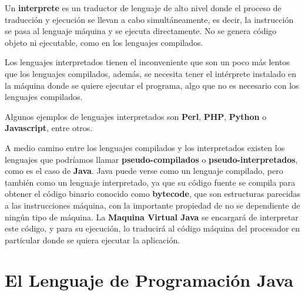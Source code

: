 Un \textbf{interprete} es un traductor de lenguaje de alto nivel donde el proceso de traducción y ejecución se llevan a cabo simultáneamente, es decir, la instrucción se pasa al lenguaje máquina y se ejecuta directamente. No se genera código objeto ni ejecutable, como en los lenguajes compilados.

Los lenguajes interpretados tienen el inconveniente que son un poco más lentos que los lenguajes compilados, además, se necesita tener el intérprete instalado en la máquina donde se quiere ejecutar el programa, algo que no es necesario con los lenguajes compilados.

Algunos ejemplos de lenguajes interpretados son \textbf{Perl}, \textbf{PHP}, \textbf{Python} o \textbf{Javascript}, entre otros.

A medio camino entre los lenguajes compilados y los interpretados existen los lenguajes que podríamos llamar \textbf{pseudo-compilados} o \textbf{pseudo-interpretados}, como es el caso de \textbf{Java}. Java puede verse como un lenguaje compilado, pero también como un lenguaje interpretado, ya que su código fuente se compila para obtener el código binario conocido como \textbf{bytecode}, que son estructuras parecidas a las instrucciones máquina, con la importante propiedad de no se dependiente de ningún tipo de máquina. La \textbf{Maquina Virtual Java} se encargará de interpretar este código, y para su ejecución, lo traducirá al código máquina del procesador en particular donde se quiera ejecutar la aplicación.

\section{El Lenguaje de Programación Java}


\newpage
{}



